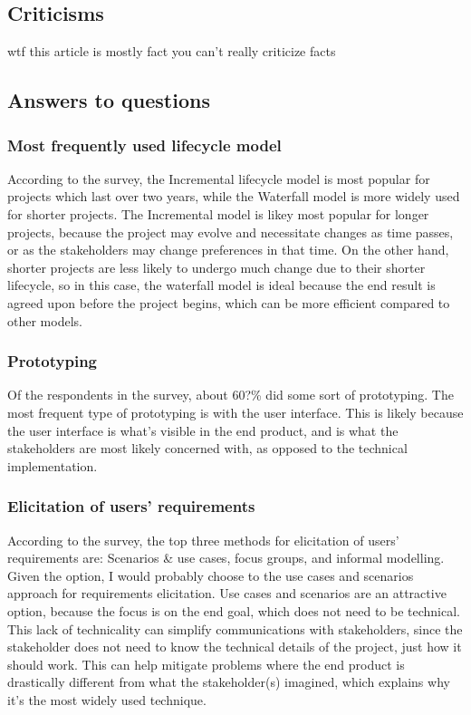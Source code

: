 \documentclass[letterpaper,12pt]{article}
\begin{document}
\subsection{Criticisms}
wtf this article is mostly fact you can't really criticize facts

\subsection{Answers to questions}

\subsubsection{Most frequently used lifecycle model}

According to the survey, the Incremental lifecycle model is most popular for projects which last over
two years, while the Waterfall model is more widely used for shorter projects.
The Incremental model is likey most popular for longer projects, because
the project may evolve and necessitate changes as time passes, or as the
stakeholders may change preferences in that time. On the other hand,
shorter projects are less likely to undergo much change due to their shorter
lifecycle, so in this case, the waterfall model is ideal because the end result is
agreed upon before the project begins, which can be more efficient compared
to other models.


\subsubsection{Prototyping}

Of the respondents in the survey, about 60?\% did some sort of prototyping.
The most frequent type of prototyping is with the user interface. This is likely
because the user interface is what's visible in the end product, and is what the
stakeholders are most likely concerned with, as opposed to the technical implementation.
\subsubsection{Elicitation of users' requirements}

According to the survey, the top three methods for
elicitation of users’ requirements are: Scenarios \& use cases, focus groups, and informal modelling.
Given the option, I would probably choose to the use cases and scenarios approach for requirements
elicitation. Use cases and scenarios are an attractive option, because the focus is on the end goal,
which does not need to be technical. This lack of technicality can simplify communications with stakeholders,
since the stakeholder does not need to know the technical details of the project, just how it should work.
This can help mitigate problems where the end product is drastically different from what the stakeholder(s)
imagined, which explains why it's the most widely used technique.
\end{document}
